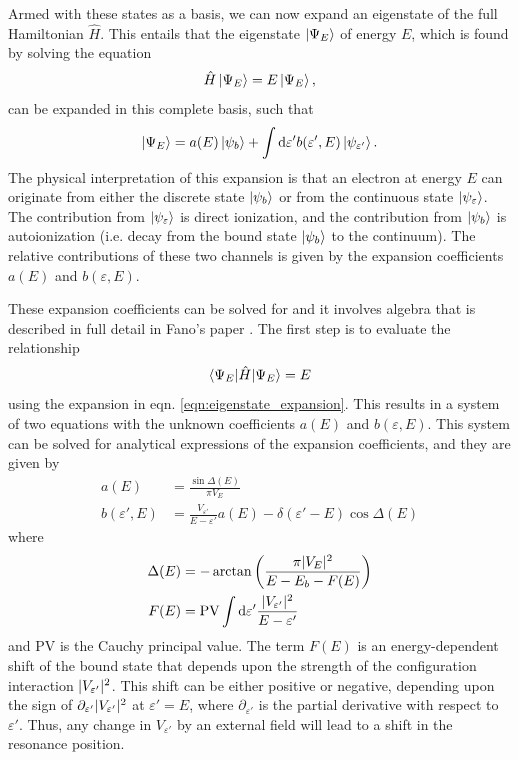 Armed with these states as a basis, we can now expand an eigenstate of the full Hamiltonian $\hat{H}$.  This entails that the eigenstate $\ket{\Psi_E}$ of energy $E$, which is found by solving the equation
\begin{equation}
	\hat{H}\ket{\Psi_E}=E\ket{\Psi_E},
\end{equation}
can be expanded in this complete basis, such that
\begin{equation}
\label{eqn:eigenstate_expansion}
	\ket{\Psi_E} = a(E)\ket{\psi_b} + \int\mathop{}\!\mathrm{d}\varepsilon'b(\varepsilon',E)\ket{\psi_{\varepsilon'}}.
\end{equation}
The physical interpretation of this expansion is that an electron at energy $E$ can originate from either the discrete state $\ket{\psi_b}$ or from the continuous state $\ket{\psi_\varepsilon}$.  The contribution from $\ket{\psi_\varepsilon}$ is direct ionization, and the contribution from $\ket{\psi_b}$ is autoionization (i.e. decay from the bound state $\ket{\psi_b}$ to the continuum).  The relative contributions of these two channels is given by the expansion coefficients $a(E)$ and $b(\varepsilon,E)$.

These expansion coefficients can be solved for and it involves algebra that is described in full detail in Fano's paper \cite{fanoEffectsConfigurationInteraction1961}.  The first step is to evaluate the relationship
\begin{equation}
	\braket{\Psi_E|\hat{H}|\Psi_E} = E
\end{equation}
using the expansion in eqn. \ref{eqn:eigenstate_expansion}.  This results in a system of two equations with the unknown coefficients $a(E)$ and $b(\varepsilon,E)$.  This system can be solved for analytical expressions of the expansion coefficients, and they are given by
\begin{align}
\label{eqn:expansion_coeff_a}
	a(E) &= \frac{\sin\Delta(E)}{\pi V_E}\\
\label{eqn:expansion_coeff_b}
	b(\varepsilon',E) &= \frac{V_{\varepsilon'}}{E-\varepsilon'}a(E)-\delta(\varepsilon'-E)\cos\Delta(E)
\end{align}
where
\begin{align}
\label{eqn:expansion_coeff_delta}
	\Delta(E) &= -\arctan\bigg(\frac{\pi\lvert V_E \rvert^2}{E-E_b-F(E)}\bigg)\\
\label{eqn:expansion_coeff_delta_F}
	F(E) &= \mathrm{PV}\int\mathop{}\!\mathrm{d}\varepsilon'\frac{\lvert V_{\varepsilon'}\rvert^2}{E-\varepsilon'} 
\end{align}
and $\mathrm{PV}$ is the Cauchy principal value. The term  $F(E)$ is an energy-dependent shift of the bound state that depends upon the strength of the configuration interaction $\lvert V_{\varepsilon'} \rvert^2$.  This shift can be either positive or negative, depending upon the sign of $\partial_{\varepsilon'}\lvert V_{\varepsilon'} \rvert^2$ at $\varepsilon'=E$, where $\partial_{\varepsilon'}$ is the partial derivative with respect to $\varepsilon'$.  Thus, any change in  $V_{\varepsilon'}$ by an external field will lead to a shift in the resonance position.

